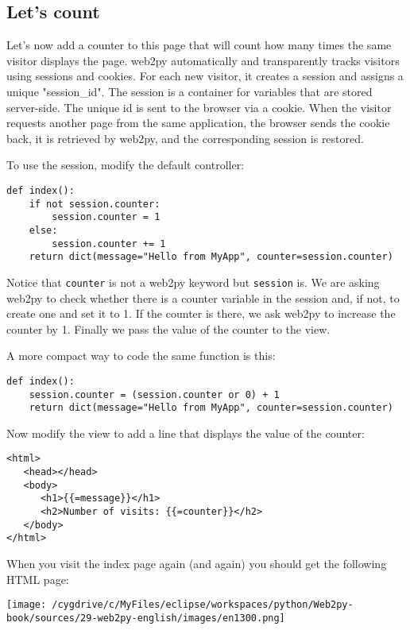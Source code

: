 \documentclass[justified,sixbynine,notoc]{tufte-book}
\def\ft{\small\tt}
\def\inxx#1{\index{#1}}
\begin{document}
\begin{fullwidth}
\goodbreak\subsection{Let's count}

\inxx{session}
Let's now add a counter to this page that will count how many times the same visitor displays the page.
\noindent web2py automatically and transparently tracks visitors using sessions and cookies. For each new visitor, it creates a session and assigns a unique "session\_id". The session is a container for variables that are stored server-side. The unique id is sent to the browser via a cookie. When the visitor requests another page from the same application, the browser sends the cookie back, it is retrieved by web2py, and the corresponding session is restored.

To use the session, modify the default controller:
\begin{lstlisting}
def index():
    if not session.counter:
        session.counter = 1
    else:
        session.counter += 1
    return dict(message="Hello from MyApp", counter=session.counter)
\end{lstlisting}

Notice that {\ft counter} is not a web2py keyword but {\ft session} is. We are asking web2py to check whether there is a counter variable in the session and, if not, to create one and set it to 1. If the counter is there, we ask web2py to increase the counter by 1. Finally we pass the value of the counter to the view.

A more compact way to code the same function is this:
\begin{lstlisting}
def index():
    session.counter = (session.counter or 0) + 1
    return dict(message="Hello from MyApp", counter=session.counter)
\end{lstlisting}

Now modify the view to add a line that displays the value of the counter:
\begin{lstlisting}[keywords={}]
<html>
   <head></head>
   <body>
      <h1>{{=message}}</h1>
      <h2>Number of visits: {{=counter}}</h2>
   </body>
</html>
\end{lstlisting}

When you visit the index page again (and again) you should get the following HTML page:


\goodbreak\begin{center}\texttt{[image: /cygdrive/c/MyFiles/eclipse/workspaces/python/Web2py-book/sources/29-web2py-english/images/en1300.png]}\end{center}



\end{fullwidth}
\end{document}
